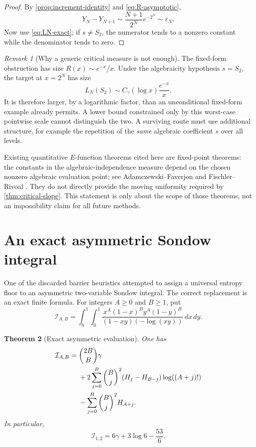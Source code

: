 \documentclass[11pt]{article}
\newtheorem{theorem}{Theorem}[section]
\theoremstyle{definition}
\theoremstyle{remark}
\newtheorem{remark}[theorem]{Remark}
\begin{document}
\begin{proof}
By \cref{prop:increment-identity} and \eqref{eq:R-asymptotic},
\[
 Y_N-Y_{N+1}\sim\frac{N+1}{2^N}e^{-2^N}
 \sim\varepsilon_N.
\]
Now use \eqref{eq:LN-exact}; if \(s\ne S_2\), the numerator tends to a
nonzero constant while the denominator tends to zero.
\end{proof}

\begin{remark}[Why a generic critical measure is not enough]
The fixed-form obstruction has size \(R(x)\sim e^{-x}/x\).  Under the
algebraicity hypothesis \(s=S_2\), the target at \(x=2^N\) has size
\[
 L_N(S_2)\sim C_\gamma(\log x)\frac{e^{-x}}x.
\]
It is therefore larger, by a logarithmic factor, than an unconditional
fixed-form example already permits.  A lower bound constrained only by this
worst-case pointwise scale cannot distinguish the two.  A surviving route
must use additional structure, for example the repetition of the \emph{same}
algebraic coefficient \(s\) over all levels.
\end{remark}

Existing quantitative \(E\)-function theorems cited here are fixed-point
theorems: the constants in the algebraic-independence measure depend on the
chosen nonzero algebraic evaluation point; see
Adamczewski--Faverjon \cite{AdamczewskiFaverjon2025} and
Fischler--Rivoal \cite{FischlerRivoal2024}.  They do not directly provide
the moving uniformity required by \cref{thm:critical-slope}.  This statement
is only about the scope of those theorems, not an impossibility claim for all
future methods.

\section{An exact asymmetric Sondow integral}
\label{sec:sondow}

One of the discarded barrier heuristics attempted to assign a universal
entropy floor to an asymmetric two-variable Sondow integral.  The correct
replacement is an exact finite formula.  For integers \(A\ge0\) and
\(B\ge1\), put
\begin{equation}\label{eq:Sondow-AB}
 \mathcal I_{A,B}=
 \int_0^1\!\!\int_0^1
 \frac{x^A(1-x)^B y^A(1-y)^B}
 {(1-xy)(-\log(xy))}\,dx\,dy.
\end{equation}

\begin{theorem}[Exact asymmetric evaluation]
\label{thm:Sondow-asymmetric}
One has
\begin{align}
 \mathcal I_{A,B}
 ={}&\binom{2B}{B}\gamma\notag\\
 &+2\sum_{j=0}^B\binom Bj^2
 (H_j-H_{B-j})\log((A+j)!)\notag\\
 &-\sum_{j=0}^B\binom Bj^2H_{A+j}.
 \label{eq:Sondow-exact}
\end{align}
In particular,
\begin{equation}\label{eq:Sondow-example}
 \mathcal I_{1,2}=6\gamma+3\log6-\frac{53}{6}.
\end{equation}
\end{theorem}
\end{document}
